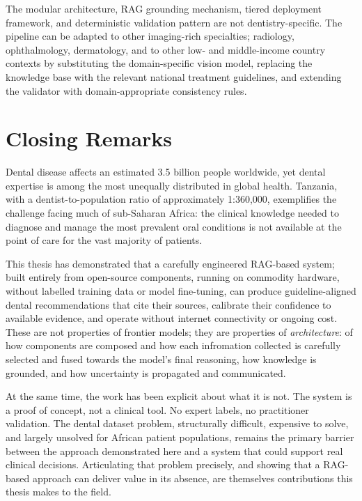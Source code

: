 \documentclass[12pt,a4paper]{report}
\begin{document}
	The modular architecture, RAG grounding mechanism, tiered deployment framework,
	and deterministic validation pattern are not dentistry-specific. The pipeline
	can be adapted to other imaging-rich specialties; radiology, ophthalmology,
	dermatology, and to other low- and middle-income country contexts by
	substituting the domain-specific vision model, replacing the knowledge base
	with the relevant national treatment guidelines, and extending the validator
	with domain-appropriate consistency rules.
	
	\section{Closing Remarks}
	\label{sec:conclusion_closing}
	
	Dental disease affects an estimated 3.5 billion people worldwide, yet dental
	expertise is among the most unequally distributed in global health. Tanzania,
	with a dentist-to-population ratio of approximately 1:360,000, exemplifies
	the challenge facing much of sub-Saharan Africa: the clinical knowledge needed
	to diagnose and manage the most prevalent oral conditions is not available at
	the point of care for the vast majority of patients.
	
	This thesis has demonstrated that a carefully engineered RAG-based system;
	built entirely from open-source components, running on commodity hardware,
	without labelled training data or model fine-tuning, can produce
	guideline-aligned dental recommendations that cite their sources, calibrate
	their confidence to available evidence, and operate without internet connectivity
	or ongoing cost. These are not properties of frontier models; they are properties
	of \emph{architecture}: of how components are composed and how each infromation collected is carefully selected and fused towards the model's final reasoning, how knowledge is
	grounded, and how uncertainty is propagated and communicated.
	
	At the same time, the work has been explicit about what it is not. The system
	is a proof of concept, not a clinical tool. No expert
	labels, no practitioner validation. The dental dataset problem, structurally
	difficult, expensive to solve, and largely unsolved for African patient
	populations, remains the primary barrier between the approach demonstrated
	here and a system that could support real clinical decisions. Articulating
	that problem precisely, and showing that a RAG-based approach can deliver value
	in its absence, are themselves contributions this thesis makes to the field.
	
\end{document}
